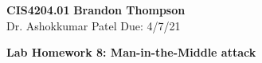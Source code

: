 \noindent
\textbf{CIS4204.01} \hfill \textbf{Brandon Thompson} \\
\normalsize Dr. Ashokkumar Patel \hfill Due: 4/7/21\\

\begin{center}
\textbf{Lab Homework 8: Man-in-the-Middle attack}
\end{center}